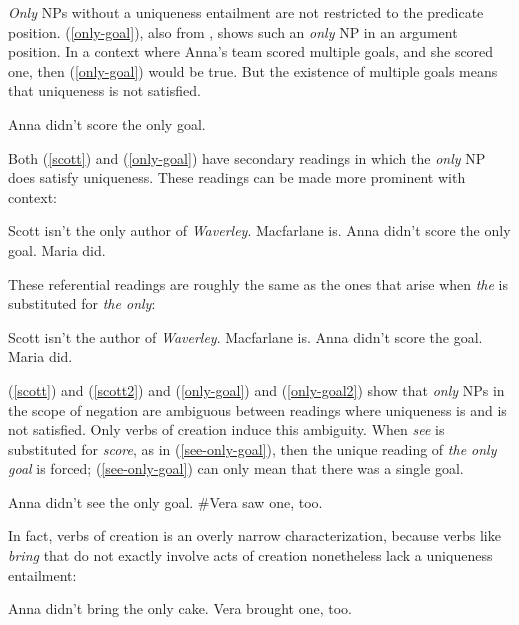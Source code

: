 \textit{Only} NPs without a uniqueness entailment are not restricted to the predicate position. (\ref{only-goal}), also from \citet{cb2015}, shows such an \textit{only} NP in an argument position. In a context where Anna's team scored multiple goals, and she scored one, then (\ref{only-goal}) would be true. But the existence of multiple goals means that uniqueness is not satisfied.

\begin{exe}
	\ex \label{only-goal} Anna didn't score the only goal.
\end{exe}

Both (\ref{scott}) and (\ref{only-goal}) have secondary readings in which the \textit{only} NP does satisfy uniqueness. These readings can be made more prominent with context:

\begin{exe}
	\ex \label{scott2} Scott isn't the only author of \textit{Waverley}. Macfarlane is.
	\ex \label{only-goal2} Anna didn't score the only goal. Maria did.
\end{exe}

These referential readings are roughly the same as the ones that arise when \textit{the} is substituted for \textit{the only}:

\begin{exe}
	\ex Scott isn't the author of \textit{Waverley}. Macfarlane is.
	\ex Anna didn't score the goal. Maria did.
\end{exe}

(\ref{scott}) and (\ref{scott2}) and (\ref{only-goal}) and (\ref{only-goal2}) show that \textit{only} NPs in the scope of negation are ambiguous between readings where uniqueness is and is not satisfied. Only verbs of creation induce this ambiguity. When \textit{see} is substituted for \textit{score}, as in (\ref{see-only-goal}), then the unique reading of \textit{the only goal} is forced; (\ref{see-only-goal}) can only mean that there was a single goal.

\begin{exe}
	\ex \label{see-only-goal} Anna didn't see the only goal. \#Vera saw one, too.
\end{exe}

In fact, verbs of creation is an overly narrow characterization, because verbs like \textit{bring} that do not exactly involve acts of creation nonetheless lack a uniqueness entailment:

\begin{exe}
	\ex Anna didn't bring the only cake. Vera brought one, too.
\end{exe}

